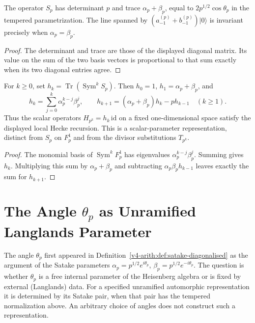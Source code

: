 \begin{theorem}
\label{v4-arith:thm:corrected-hecke}
The operator \(S_p\) has determinant \(p\) and trace
\(\alpha_p+\beta_p\), equal to \(2p^{1/2}\cos\theta_p\) in the tempered
parametrization. The line spanned by
\((a^{(p)}_{-1}+b^{(p)}_{-1})|0\rangle\) is invariant precisely when
\(\alpha_p=\beta_p\).
\end{theorem}
\begin{proof}
The determinant and trace are those of the displayed diagonal matrix.
Its value on the sum of the two basis vectors is proportional to that
sum exactly when its two diagonal entries agree.
\end{proof}

\begin{corollary}
\label{v4-arith:cor:hecke-recursion-Sym}
For \(k\ge0\), set \(h_k=\operatorname{Tr}(\operatorname{Sym}^kS_p)\).
Then \(h_0=1\), \(h_1=\alpha_p+\beta_p\), and
\[
 h_k=\sum_{j=0}^k\alpha_p^{k-j}\beta_p^j,\qquad
 h_{k+1}=(\alpha_p+\beta_p)h_k-p h_{k-1}\quad(k\ge1).
\]
Thus the scalar operators \(H_{p^k}=h_k\,\mathrm{id}\) on a fixed
one-dimensional space satisfy the displayed local Hecke recursion.
This is a scalar-parameter representation, distinct from \(S_p\) on
\(F_p^1\) and from the divisor substitutions \(T_{p^k}\).
\end{corollary}
\begin{proof}
The monomial basis of \(\operatorname{Sym}^kF_p^1\) has eigenvalues
\(\alpha_p^{k-j}\beta_p^j\). Summing gives \(h_k\). Multiplying this
sum by \(\alpha_p+\beta_p\) and subtracting
\(\alpha_p\beta_p h_{k-1}\) leaves exactly the sum for \(h_{k+1}\).
\end{proof}

\section{The Angle \(\theta_{p}\) as Unramified Langlands Parameter}
\label{v4-arith:kb:theta-p-background}

The angle \(\theta_{p}\) first appeared in Definition~\ref{v4-arith:def:satake-diagonalised}
as the argument of the Satake parameters \(\alpha_{p}=p^{1/2}e^{i\theta_{p}}\),
\(\beta_{p}=p^{1/2}e^{-i\theta_{p}}\). The question is whether \(\theta_{p}\) is
a free internal parameter of the Heisenberg algebra or is fixed by external
(Langlands) data. For a specified unramified automorphic representation it is determined
by its Satake pair, when that pair has the tempered normalization above.
An arbitrary choice of angles does not construct such a representation.

